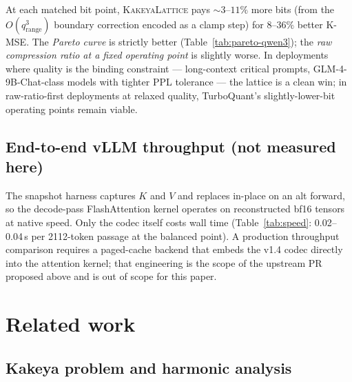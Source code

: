 \documentclass[11pt,a4paper]{article}
\theoremstyle{definition}
\theoremstyle{plain}
\begin{document}
At each matched bit point, \textsc{KakeyaLattice} pays $\sim\!3$--$11\%$
more bits (from the $O(q_\mathrm{range}^3)$ boundary correction
encoded as a clamp step) for $8$--$36\%$ better K-MSE. The
\emph{Pareto curve} is strictly better (Table~\ref{tab:pareto-qwen3});
the \emph{raw compression ratio at a fixed operating point} is
slightly worse. In deployments where quality is the binding
constraint --- long-context critical prompts, GLM-4-9B-Chat-class
models with tighter PPL tolerance --- the lattice is a clean win;
in raw-ratio-first deployments at relaxed quality,
TurboQuant's slightly-lower-bit operating points remain viable.

\subsection{End-to-end vLLM throughput (not measured here)}

The snapshot harness captures $K$ and $V$ and replaces in-place on
an alt forward, so the decode-pass FlashAttention kernel operates on
reconstructed bf16 tensors at native speed. Only the codec itself
costs wall time (Table~\ref{tab:speed}: 0.02--0.04\,s per
2112-token passage at the balanced point). A production throughput
comparison requires a paged-cache backend that embeds the v1.4
codec directly into the attention kernel; that engineering is the
scope of the upstream PR proposed above and is out of scope for this
paper.

\section{Related work}
\label{sec:related}

\subsection{Kakeya problem and harmonic analysis}
\end{document}
